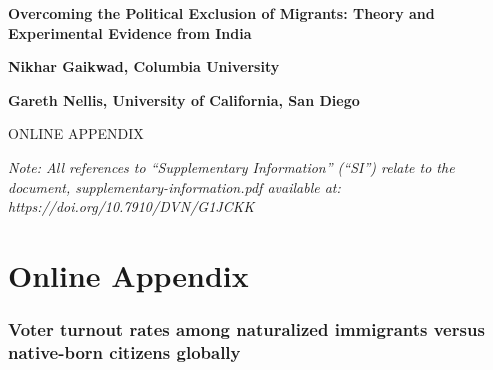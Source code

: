 \documentclass[
  11.5pt,
]{article}
\begin{document}
\clearpage

\begin{center}
\Large{\textbf{Overcoming the Political Exclusion of Migrants: Theory and Experimental Evidence from India}}
\end{center}

\vspace{20pt}

\begin{center}
\large{\textbf{Nikhar Gaikwad, Columbia University}}
\end{center}

\begin{center}
\large{\textbf{Gareth Nellis, University of California, San Diego}}
\end{center}

\vspace{20pt}

\begin{center}
\huge{ONLINE APPENDIX}
\end{center}

\vspace{20pt}

\begin{center}
\huge{\textit{Note: All references to ``Supplementary Information'' (``SI'') relate to the document, supplementary-information.pdf available at: https://doi.org/10.7910/DVN/G1JCKK}}
\end{center}

\setcounter{page}{0}
\setcounter{page}{1}
\setcounter{figure}{0}
\setcounter{table}{0}
\renewcommand{\thefigure}{A\arabic{figure}}
\renewcommand{\thetable}{A\arabic{table}}

\clearpage

\part*{Online Appendix}
\localtableofcontents

\clearpage

\section{Voter turnout rates among naturalized immigrants versus native-born citizens globally}
\end{document}

